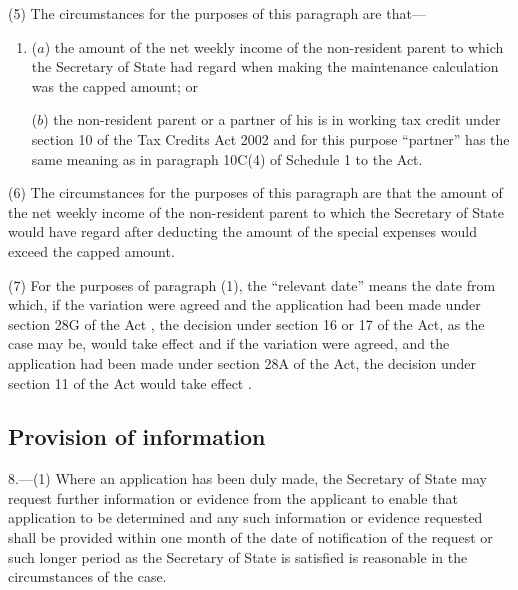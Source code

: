 \documentclass[12pt,a4paper]{article}
\begin{document}
(5) The circumstances for the purposes of this paragraph are that—
\begin{enumerate}\item[]
($a$) the amount of the net weekly income of the non-resident parent to which the Secretary of State had regard when making the maintenance calculation was the capped amount; or

($b$) the non-resident parent or a partner of his is in 
working tax credit under section 10 of the Tax Credits Act 2002  %
and for this purpose “partner” has the same meaning as in paragraph 10C(4) of Schedule 1 to the Act.
\end{enumerate}

(6) The circumstances for the purposes of this paragraph are that the amount of the net weekly income of the non-resident parent to which the Secretary of State would have regard after deducting the amount of the special expenses would exceed the capped amount.

(7) For the purposes of paragraph (1), the “relevant date” means the date from which, if the variation were agreed
and the application had been made under section 28G of the Act%
, the decision under section 16 or 17 of the Act, as the case may be, would take effect
and if the variation were agreed, and the application had been made under section 28A of the Act, the decision under section 11 of the Act would take effect%
.


\subsection[8. Provision of information]{Provision of information}

8.---(1)  Where an application has been duly made, the Secretary of State may request further information or evidence from the applicant to enable that application to be determined and any such information or evidence requested shall be provided within one month of the date of notification of the request or such longer period as the Secretary of State is satisfied is reasonable in the circumstances of the case.
\end{document}
